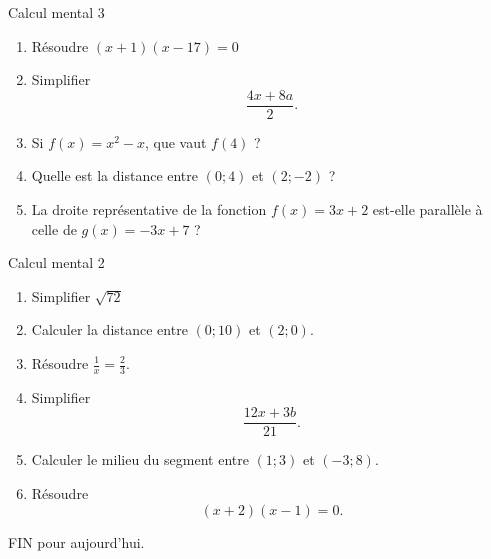 \documentclass{beamer}
\begin{document}
\begin{frame}{Calcul mental 3}
    \pause
    \begin{enumerate}
        \item
            Résoudre \( (x+1)(x-17)=0\)
            \pause
        \item
            Simplifier
            \begin{equation}
                \frac{ 4x+8a }{ 2 }.
            \end{equation}
            \pause
        \item
            Si \( f(x)=x^2-x\), que vaut \( f(4)\) ?
            \pause
        \item
            Quelle est la distance entre \( (0;4)\) et \( (2;-2)\) ?
            \pause
        \item
            La droite représentative de la fonction \( f(x)=3x+2\) est-elle parallèle à celle de \( g(x)=-3x+7\) ?
    \end{enumerate}
\end{frame}

\begin{frame}{Calcul mental 2}
    \pause
    \begin{enumerate}
        \item
            Simplifier \( \sqrt{72}\)
            \pause
        \item
            Calculer la distance entre \( (0;10)\) et \( (2;0)\).
            \pause
        \item
            Résoudre \( \frac{1}{ x }=\frac{ 2 }{ 3 }\).
            \pause
        \item
            Simplifier 
            \begin{equation*}
                \frac{ 12x+3b }{ 21 }.
            \end{equation*}
            \pause
        \item
            Calculer le milieu du segment entre \( (1;3)\) et \( (-3;8)\).
            \pause
        \item
            Résoudre
            \begin{equation*}
                (x+2)(x-1)=0.
            \end{equation*}
            \pause
    \end{enumerate}
    \begin{center}
        FIN pour aujourd'hui.
    \end{center}
\end{frame}
\end{document}
